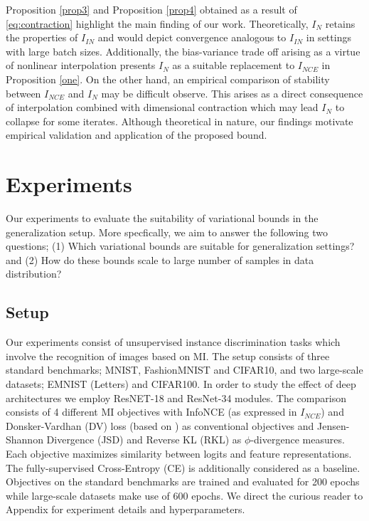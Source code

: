 \documentclass{article}
\begin{document}
Proposition \autoref{prop3} and Proposition \autoref{prop4} obtained as a result of \autoref{eq:contraction} highlight the main finding of our work. Theoretically, $I_{N}$ retains the properties of $I_{IN}$ and would depict convergence analogous to $I_{IN}$ in settings with large batch sizes. Additionally, the bias-variance trade off arising as a virtue of nonlinear interpolation presents $I_{N}$ as a suitable replacement to $I_{NCE}$ in Proposition \autoref{one}. On the other hand, an empirical comparison of stability between $I_{NCE}$ and $I_{N}$ may be difficult observe. This arises as a direct consequence of interpolation combined with dimensional contraction which may lead $I_{N}$ to collapse for some iterates. Although theoretical in nature, our findings motivate empirical validation and application of the proposed bound. 
\section{Experiments}
Our experiments to evaluate the suitability of variational bounds in the generalization setup. More specfically, we aim to answer the following two questions; (1) Which variational bounds are suitable for generalization settings? and (2) How do these bounds scale to large number of samples in data distribution? 

\subsection{Setup}
Our experiments consist of unsupervised instance discrimination tasks \cite{visual} which involve the recognition of images based on MI. The setup consists of three standard benchmarks; MNIST, FashionMNIST and CIFAR10, and two large-scale datasets; EMNIST (Letters) and CIFAR100. In order to study the effect of deep architectures we employ ResNET-18 and ResNet-34 modules. The comparison consists of 4 different MI objectives with InfoNCE (as expressed in $I_{NCE}$) and Donsker-Vardhan (DV) loss (based on \cite{infomax}) as conventional objectives and Jensen-Shannon Divergence (JSD) and Reverse KL (RKL) as $\phi$-divergence measures. Each objective maximizes similarity between logits and feature representations. The fully-supervised Cross-Entropy (CE) is additionally considered as a baseline. Objectives on the standard benchmarks are trained and evaluated for 200 epochs while large-scale datasets make use of 600 epochs. We direct the curious reader to Appendix for experiment details and hyperparameters.  
\end{document}
